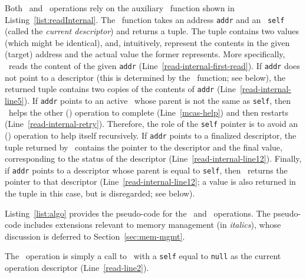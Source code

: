 Both \mcas\ and \ttread\ operations rely on the auxiliary \readInternal\ function shown in Listing~\ref{list:readInternal}. 
The \readInternal\ function takes an address \texttt{addr} and an \mcasdescriptor\ \texttt{self} (called the \emph{current descriptor}) and returns a tuple. 
The tuple contains two values (which might be identical), and, intuitively, represent the contents in the given (target) address and the actual value 
the former represents.
More specifically, \readInternal\  reads the content of the given \texttt{addr} (Line~\ref{read-internal-first-read}). 
If \texttt{addr} does not point to a descriptor (this is determined by the \isDescriptor\ function; see below), the returned tuple contains two copies of the contents of \texttt{addr} (Line~\ref{read-internal-line5}).
If \texttt{addr} points to an active \worddescriptor\ whose parent is not the same as \texttt{self}, then \readInternal\ helps the other (\mcas) 
operation to complete (Line~\ref{mcas-help}) and then restarts (Line~\ref{read-internal-retry}).
Therefore, the role of the \texttt{self} pointer is to avoid an (\mcas) operation to help itself recursively.
If \texttt{addr} points to a finalized descriptor, the tuple returned by \readInternal\ contains 
the pointer to the descriptor and the final value, corresponding to the status of the descriptor (Line~\ref{read-internal-line12}).
Finally, if \texttt{addr} points to a descriptor whose parent is equal to \texttt{self}, 
then \readInternal\ returns the pointer to that descriptor (Line~\ref{read-internal-line12}; a value is also returned in the tuple in this case, but is disregarded; see below).

Listing~\ref{list:algo} provides the pseudo-code for the \ttread\ and \mcas\ operations.
The pseudo-code includes extensions relevant to memory management (in \emph{italics}), whose discussion is deferred to Section~\ref{sec:mem-mgmt}.

The \ttread\ operation is simply a call to \readInternal\ with a \texttt{self} equal to \texttt{null} as the current operation descriptor (Line~\ref{read-line2}).

